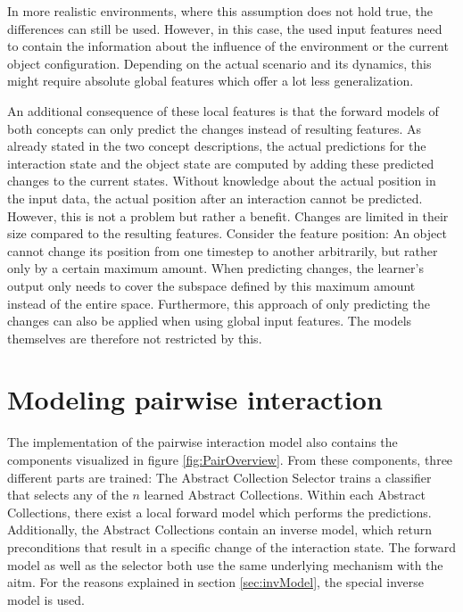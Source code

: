 In more realistic environments, where this assumption does not hold true, the differences can still be used. However, in this case, the used input features need to contain the information about the influence of the environment or the current object configuration. Depending on the actual scenario and its dynamics, this might require absolute global features which offer a lot less generalization.

An additional consequence of these local features is that the forward models of both concepts can only predict the changes instead of resulting features. As already stated in the two concept descriptions, the actual predictions for the interaction state and the object state are computed by adding these predicted changes to the current states.
Without knowledge about the actual position in the input data, the actual position after an interaction cannot be predicted. However, this is not a problem but rather a benefit. Changes are limited in their size compared to the resulting features. 
Consider the feature position: An object cannot change its position from one timestep to another arbitrarily, but rather only by a certain maximum amount. When predicting changes, the learner's output only needs to cover the subspace defined by this maximum amount instead of the entire space. Furthermore, this approach of only predicting the changes can also be applied when using global input features. The models themselves are therefore not restricted by this.


\section{Modeling pairwise interaction \label{sec:pairRealization}}


The implementation of the pairwise interaction model also contains the components visualized in figure \ref{fig:PairOverview}. From these components, three different parts are trained:
The Abstract Collection Selector trains a classifier that selects any of the $n$ learned Abstract Collections. Within each Abstract Collections, there exist a local forward model which performs the predictions. Additionally, the Abstract Collections contain an inverse model, which return preconditions that result in a specific change of the interaction state. The forward model as well as the selector both use the same underlying mechanism with the \gls{aitm}. For the reasons explained in section \ref{sec:invModel}, the special inverse model is used.

